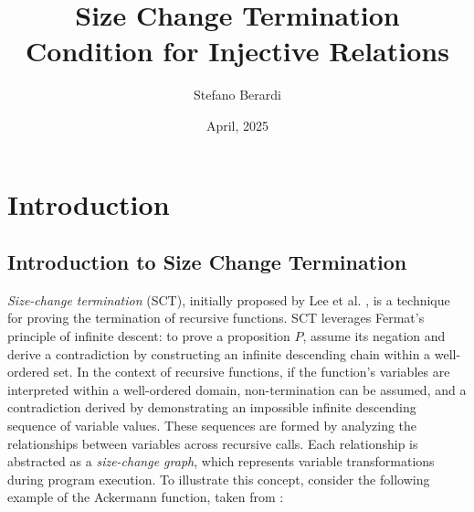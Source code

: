 \documentclass{article}
\title{Size Change Termination Condition for Injective Relations}
\author{Stefano Berardi}
\date{April, 2025}
\begin{document}
\maketitle

\section{Introduction}

\subsection{Introduction to Size Change Termination}

\textit{Size-change termination} (SCT), initially proposed by Lee et al. \cite{Lee1}, is a technique for proving the termination of recursive functions. SCT leverages Fermat's principle of infinite descent: to prove a proposition $P$, assume its negation and derive a contradiction by constructing an infinite descending chain within a well-ordered set. In the context of recursive functions, if the function's variables are interpreted within a well-ordered domain, non-termination can be assumed, and a contradiction derived by demonstrating an impossible infinite descending sequence of variable values. These sequences are formed by analyzing the relationships between variables across recursive calls. Each relationship is abstracted as a \textit{size-change graph}, which represents variable transformations during program execution. To illustrate this concept, consider the following example of the Ackermann function, taken from \cite{Lee2}: 
\end{document}

